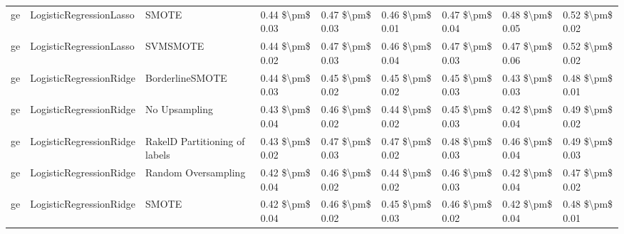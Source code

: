 \begin{tabular}{lllllllll}
      ge &         LogisticRegressionLasso &                         SMOTE & 0.44 \$\textbackslash pm\$ 0.03 &           0.47 \$\textbackslash pm\$ 0.03 &       0.46 \$\textbackslash pm\$ 0.01 &        0.47 \$\textbackslash pm\$ 0.04 &                         0.48 \$\textbackslash pm\$ 0.05 &     0.52 \$\textbackslash pm\$ 0.02 \\
      ge &         LogisticRegressionLasso &                      SVMSMOTE & 0.44 \$\textbackslash pm\$ 0.02 &           0.47 \$\textbackslash pm\$ 0.03 &       0.46 \$\textbackslash pm\$ 0.04 &        0.47 \$\textbackslash pm\$ 0.03 &                         0.47 \$\textbackslash pm\$ 0.06 &     0.52 \$\textbackslash pm\$ 0.02 \\
      ge &         LogisticRegressionRidge &               BorderlineSMOTE & 0.44 \$\textbackslash pm\$ 0.03 &           0.45 \$\textbackslash pm\$ 0.02 &       0.45 \$\textbackslash pm\$ 0.02 &        0.45 \$\textbackslash pm\$ 0.03 &                         0.43 \$\textbackslash pm\$ 0.03 &     0.48 \$\textbackslash pm\$ 0.01 \\
      ge &         LogisticRegressionRidge &                 No Upsampling & 0.43 \$\textbackslash pm\$ 0.04 &           0.46 \$\textbackslash pm\$ 0.02 &       0.44 \$\textbackslash pm\$ 0.02 &        0.45 \$\textbackslash pm\$ 0.03 &                         0.42 \$\textbackslash pm\$ 0.04 &     0.49 \$\textbackslash pm\$ 0.02 \\
      ge &         LogisticRegressionRidge & RakelD Partitioning of labels & 0.43 \$\textbackslash pm\$ 0.02 &           0.47 \$\textbackslash pm\$ 0.03 &       0.47 \$\textbackslash pm\$ 0.02 &        0.48 \$\textbackslash pm\$ 0.03 &                         0.46 \$\textbackslash pm\$ 0.04 &     0.49 \$\textbackslash pm\$ 0.03 \\
      ge &         LogisticRegressionRidge &           Random Oversampling & 0.42 \$\textbackslash pm\$ 0.04 &           0.46 \$\textbackslash pm\$ 0.02 &       0.44 \$\textbackslash pm\$ 0.02 &        0.46 \$\textbackslash pm\$ 0.03 &                         0.42 \$\textbackslash pm\$ 0.04 &     0.47 \$\textbackslash pm\$ 0.02 \\
      ge &         LogisticRegressionRidge &                         SMOTE & 0.42 \$\textbackslash pm\$ 0.04 &           0.46 \$\textbackslash pm\$ 0.02 &       0.45 \$\textbackslash pm\$ 0.03 &        0.46 \$\textbackslash pm\$ 0.02 &                         0.42 \$\textbackslash pm\$ 0.04 &     0.48 \$\textbackslash pm\$ 0.01 \\

\end{tabular}
